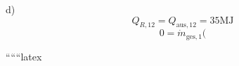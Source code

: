 d)
\[
Q_{R,12} = Q_{\text{aus},12} = 35 \text{MJ}
\]
\[
0 = \dot{m}_{\text{ges},1} (
\]

``````latex